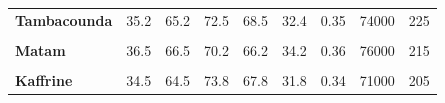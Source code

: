 \documentclass[
]{article}
\begin{document}
\begin{longtable}[t]{>{}lrrrrrrrr}
\textcolor[HTML]{B92346}{\textbf{Tambacounda}} & 35.2 & 65.2 & 72.5 & 68.5 & 32.4 & 0.35 & 74000 & 225\\
\addlinespace
\textcolor[HTML]{B92346}{\textbf{\cellcolor{gray!10}{Kédougou}}} & \cellcolor{gray!10}{28.5} & \cellcolor{gray!10}{58.5} & \cellcolor{gray!10}{78.5} & \cellcolor{gray!10}{75.2} & \cellcolor{gray!10}{25.4} & \cellcolor{gray!10}{0.29} & \cellcolor{gray!10}{62000} & \cellcolor{gray!10}{165}\\
\textcolor[HTML]{B92346}{\textbf{Matam}} & 36.5 & 66.5 & 70.2 & 66.2 & 34.2 & 0.36 & 76000 & 215\\
\textcolor[HTML]{B92346}{\textbf{\cellcolor{gray!10}{Sédhiou}}} & \cellcolor{gray!10}{30.5} & \cellcolor{gray!10}{60.5} & \cellcolor{gray!10}{76.8} & \cellcolor{gray!10}{70.5} & \cellcolor{gray!10}{28.8} & \cellcolor{gray!10}{0.31} & \cellcolor{gray!10}{65000} & \cellcolor{gray!10}{185}\\
\textcolor[HTML]{B92346}{\textbf{Kaffrine}} & 34.5 & 64.5 & 73.8 & 67.8 & 31.8 & 0.34 & 71000 & 205\\
\bottomrule
\end{longtable}
\endgroup{}
\end{document}
